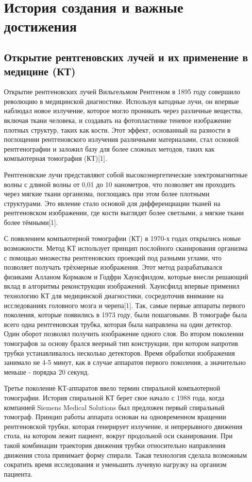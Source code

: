 \section{История создания и важные достижения}
\subsection{Открытие рентгеновских лучей и их применение в медицине (КТ)}
Открытие рентгеновских лучей Вильгельмом Рентгеном в 1895 году совершило революцию в медицинской диагностике. Используя катодные лучи, он впервые наблюдал новое излучение, которое могло проникать через различные вещества, включая ткани человека, и создавать на фотопластинке теневое изображение плотных структур, таких как кости. Этот эффект, основанный на разности в поглощении рентгеновского излучения различными материалами, стал основой рентгенографии и заложил базу для более сложных методов, таких как компьютерная томография (КТ)[1].

Рентгеновские лучи представляют собой высокоэнергетические электромагнитные волны с длиной волны от 0,01 до 10 нанометров, что позволяет им проходить через мягкие ткани организма, поглощаясь при этом более плотными структурами. Это явление стало основой для дифференциации тканей на рентгеновском изображении, где кости выглядят более светлыми, а мягкие ткани более тёмными[1].

С появлением компьютерной томографии (КТ) в 1970-х годах открылись новые возможности. Метод КТ использует принцип послойного сканирования организма с помощью множества рентгеновских проекций под разными углами, что позволяет получать трёхмерные изображения. Этот метод разрабатывался физиками Алланом Кормаком и Годфри Хаунсфилдом, которые внесли решающий вклад в алгоритмы реконструкции изображений. Хаунсфилд впервые применил технологию КТ для медицинской диагностики, сосредоточив внимание на исследованиях головного мозга и черепа[1].
Так, самые первые аппараты первого поколения, которые появились в 1973 году, были пошаговыми. В томографе была всего одна рентгеновская трубка, которая была направлена на один детектор. Один оборот позволял получить изображение одного слоя. Во втором поколении томографов за основу брался веерный тип конструкции, при котором напротив трубки устанавливалось несколько детекторов. Время обработки изображения занимало не 4-5 минут, как в случае аппаратов первого поколения, а значительно меньше - порядка 20 секунд.

Третье поколение КТ-аппаратов ввело термин спиральной компьютерной томографии. История спиральной КТ берет свое начало с 1988 года, когда компанией Siemens Medical Solutions был предложен первый спиральный томограф. Принцип работы аппарата основан на одновременном вращении рентгеновской трубки, которая генерирует излучение, и непрерывного движения стола, на котором лежит пациент, вокруг продольной оси сканирования. При такой комбинации траектория движения трубки относительно направления движения стола принимает форму спирали. Такая технология сделала возможным сократить время исследования и уменьшить лучевую нагрузку на организм пациента.

